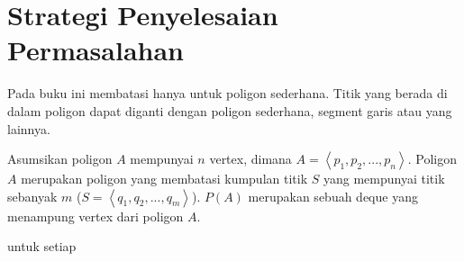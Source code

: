 \section{Strategi Penyelesaian Permasalahan}
Pada buku ini membatasi hanya untuk poligon sederhana. Titik yang berada di dalam poligon dapat diganti dengan poligon sederhana, segment garis atau yang lainnya.
\par Asumsikan poligon $A$ mempunyai $n$ vertex, dimana $A = \left \langle p_1, p_2, ..., p_n \right \rangle$. Poligon $A$ merupakan poligon yang membatasi kumpulan titik $S$ yang mempunyai titik sebanyak $m$ ($S = \left \langle q_1, q_2, ..., q_m \right \rangle$). $P(A)$ merupakan sebuah deque yang menampung vertex dari poligon $A$.
\par untuk setiap 
